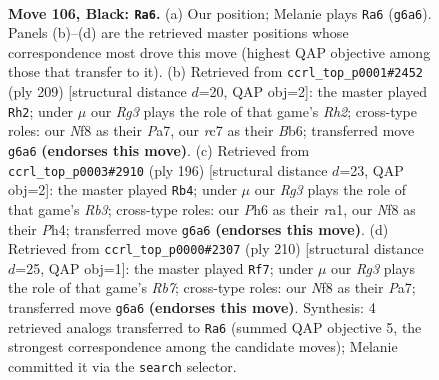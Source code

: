 \documentclass[11pt]{article}
\begin{document}
\clearpage

\begin{figure}[p]\centering
\begin{subfigure}{0.46\textwidth}\centering
\resizebox{\linewidth}{!}{%
\newchessgame
\chessboard[
  setfen={5n2/2R5/6rp/4p3/6kb/1K1p4/8/8 b - - 9 106},
  showmover=false,
  pgfstyle=straightmove, color=movearrow, markmove={g6-a6}
]}
\caption{}
\end{subfigure}\hfill
\begin{subfigure}{0.46\textwidth}\centering
\resizebox{\linewidth}{!}{%
\newchessgame
\chessboard[
  setfen={8/p5kr/1b2B3/8/4K3/8/8/5R2 b - - 5 105},
  showmover=false,
  pgfstyle=straightmove, color=movearrow, markmove={h7-h2}
]}
\caption{}
\end{subfigure}
\\[4pt]
\begin{subfigure}{0.46\textwidth}\centering
\resizebox{\linewidth}{!}{%
\newchessgame
\chessboard[
  setfen={5k2/8/6p1/6P1/7P/1R5K/8/r7 w - - 9 99},
  showmover=false,
  pgfstyle=straightmove, color=movearrow, markmove={b3-b4}
]}
\caption{}
\end{subfigure}\hfill
\begin{subfigure}{0.46\textwidth}\centering
\resizebox{\linewidth}{!}{%
\newchessgame
\chessboard[
  setfen={8/PR6/r7/2k5/8/2P5/1K6/8 w - - 3 106},
  showmover=false,
  pgfstyle=straightmove, color=movearrow, markmove={b7-f7}
]}
\caption{}
\end{subfigure}
\caption{\textbf{Move 106, Black: \texttt{Ra6}.} (a) Our position; Melanie plays \texttt{Ra6} (\texttt{g6a6}). Panels (b)--(d) are the retrieved master positions whose correspondence most drove this move (highest QAP objective among those that transfer to it). (b) Retrieved from \texttt{ccrl\_top\_p0001\#2452} (ply 209) [structural distance $d$=20, QAP obj=2]: the master played \texttt{Rh2}; under $\mu$ our \emph{Rg3} plays the role of that game's \emph{Rh2}; cross-type roles: our \emph{N}f8 as their \emph{P}a7, our \emph{r}c7 as their \emph{B}b6; transferred move \texttt{g6a6} \textbf{(endorses this move)}. (c) Retrieved from \texttt{ccrl\_top\_p0003\#2910} (ply 196) [structural distance $d$=23, QAP obj=2]: the master played \texttt{Rb4}; under $\mu$ our \emph{Rg3} plays the role of that game's \emph{Rb3}; cross-type roles: our \emph{P}h6 as their \emph{r}a1, our \emph{N}f8 as their \emph{P}h4; transferred move \texttt{g6a6} \textbf{(endorses this move)}. (d) Retrieved from \texttt{ccrl\_top\_p0000\#2307} (ply 210) [structural distance $d$=25, QAP obj=1]: the master played \texttt{Rf7}; under $\mu$ our \emph{Rg3} plays the role of that game's \emph{Rb7}; cross-type roles: our \emph{N}f8 as their \emph{P}a7; transferred move \texttt{g6a6} \textbf{(endorses this move)}. Synthesis: 4 retrieved analogs transferred to \texttt{Ra6} (summed QAP objective 5, the strongest correspondence among the candidate moves); Melanie committed it via the \texttt{search} selector.}
\label{fig:thought-m211}
\end{figure}
\end{document}

